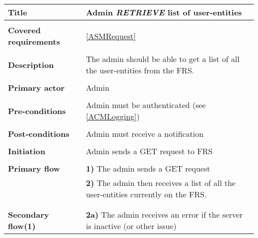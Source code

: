 \documentclass[a4paper,11pt]{article}
\begin{document}
\begin{tabular}{|p{3.5cm}|p{11.5cm}|} \hline
    \textbf{Title} &   Admin \emph{RETRIEVE} list of user-entities
        
    \\ \hline \rowcolor{Gray} & \\ \hline
    
    \textbf{Covered requirements} &  \ref{ASMRequest}
        
    \\ \hline \rowcolor{Gray} & \\ \hline
        
    \textbf{Description} &  The admin should be able to get a list of all the user-entities from the FRS.
        
    \\ \hline \rowcolor{Gray} & \\ \hline
        
    \textbf{Primary actor} & Admin  
        
    \\ \hline \rowcolor{Gray} & \\ \hline 
          
    \textbf{Pre-conditions} &   Admin must be authenticated (see \ref{ACMLogging})
        
    \\ \hline \rowcolor{Gray} & \\ \hline
         
    \textbf{Post-conditions} &   Admin must receive a notification
        
    \\ \hline \rowcolor{Gray} & \\ \hline 
         
    \textbf{Initiation} & Admin sends a GET request to FRS
        
    \\ \hline \rowcolor{Gray} & \\ \hline 
         
    \textbf{Primary flow} & 
    \textbf{1)} The admin sends a GET request \\&
    \textbf{2)} The admin then receives a list of all the user-entities currently on the FRS. \\&
        
    \\ \hline \rowcolor{Gray} & \\ \hline 
         
    \textbf{Secondary flow(1)} & 
    \textbf{2a)} The admin receives an error if the server is inactive (or other issue)
    
    \\ \hline 
\end{tabular}
\end{document}
